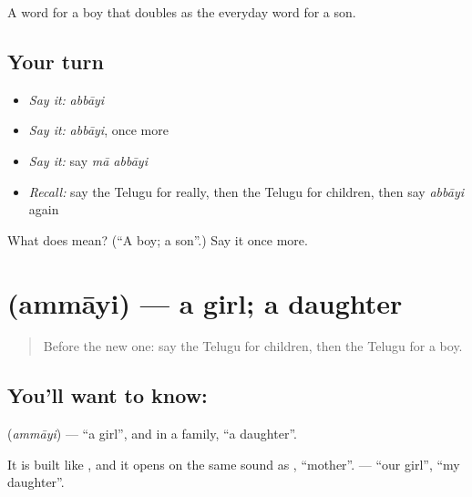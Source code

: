 \begin{grammarlens}[title={What you've built}]
A word for a boy that doubles as the everyday word for a son.
\end{grammarlens}

\subsection*{Your turn}
\begin{itemize}
\raggedright
  \item \emph{Say it:} \emph{abbāyi}
  \item \emph{Say it:} \emph{abbāyi}, once more
  \item \emph{Say it:} say \emph{mā abbāyi}
  \item \emph{Recall:} say the Telugu for really, then the Telugu for children, then say \emph{abbāyi} again
\end{itemize}

\begin{tcolorbox}[breakable,colback=teal!4,colframe=teal!35!black,title={Before you move on}]
What does  mean? (\textquotedblleft{}A boy; a son\textquotedblright{}.) Say it once more.
\end{tcolorbox}
\section[\texorpdfstring{\te{అమ్మాయి} (ammāyi)}{అమ్మాయి (ammāyi)}]{ (ammāyi) — a girl; a daughter}

\label{lesson:TE-C88-girl}



\begin{quote}
Before the new one: say the Telugu for children, then the Telugu for a boy.
\end{quote}

\subsection*{You'll want to know: }
\textbf{} (\emph{ammāyi}) — \textquotedblleft{}a girl\textquotedblright{}, and in a family, \textquotedblleft{}a daughter\textquotedblright{}.

It is built like \textbf{}, and it opens on the same sound as \textbf{}, \textquotedblleft{}mother\textquotedblright{}. \textbf{ } — \textquotedblleft{}our girl\textquotedblright{}, \textquotedblleft{}my daughter\textquotedblright{}.

